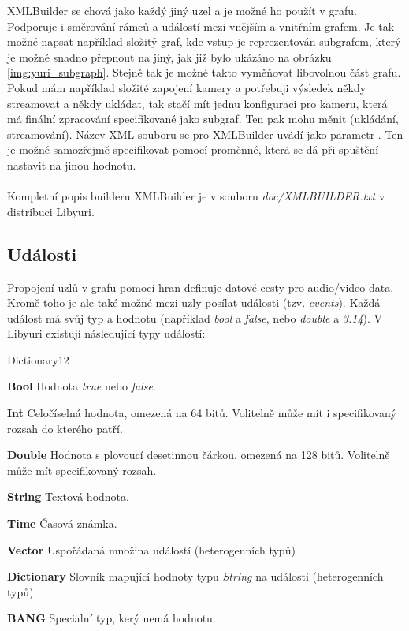 \documentclass[thesis=M,czech]{FITthesis}[2012/06/26]
\begin{document}
XMLBuilder se chová jako každý jiný uzel a je možné ho použít v grafu. Podporuje i směrování rámců a událostí mezi vnějším a vnitřním grafem. Je tak možné napsat například složitý graf, kde vstup je reprezentován subgrafem, který je možné snadno přepnout na jiný, jak již bylo ukázáno na obrázku \ref{img:yuri_subgraph}. Stejně tak je možné takto vyměňovat libovolnou část grafu. Pokud mám například složité zapojení kamery a potřebuji výsledek někdy streamovat a někdy ukládat, tak stačí mít jednu konfiguraci pro kameru, která má finální zpracování specifikované jako subgraf. Ten pak mohu měnit (ukládání, streamování). 
Název XML souboru se pro XMLBuilder uvádí jako parametr . Ten je možné samozřejmě specifikovat pomocí proměnné, která se dá při spuštění nastavit na jinou hodnotu. 
\\ \\
Kompletní popis builderu XMLBuilder je v souboru \textit{doc/XMLBUILDER.txt} v distribuci Libyuri.

\subsection{Události} \label{subsec:analyza_yuri_udalosti}
Propojení uzlů v grafu pomocí hran definuje datové cesty pro audio/video data. Kromě toho je ale také možné mezi uzly posílat události (tzv. \textit{events}). Každá událost má svůj typ a hodnotu (například \textit{bool} a \textit{false}, nebo \textit{double} a \textit{3.14}). V Libyuri existují následující typy událostí:

\begin{labeling}{Dictionary12}
\item [\textbf{Bool}] Hodnota \textit{true} nebo \textit{false}.
\item [\textbf{Int}] Celočíselná hodnota, omezená na 64 bitů. Volitelně může mít i specifikovaný rozsah do kterého patří.
\item [\textbf{Double}] Hodnota s plovoucí desetinnou čárkou, omezená na 128 bitů. Volitelně může mít specifikovaný rozsah.
\item [\textbf{String}] Textová hodnota.
\item [\textbf{Time}] Časová známka.
\item [\textbf{Vector}] Uspořádaná množina událostí (heterogenních typů)
\item [\textbf{Dictionary}] Slovník mapující hodnoty typu \textit{String} na události (heterogenních typů)
\item [\textbf{BANG}] Specialní typ, kerý nemá hodnotu.
\end{labeling}
\end{document}
